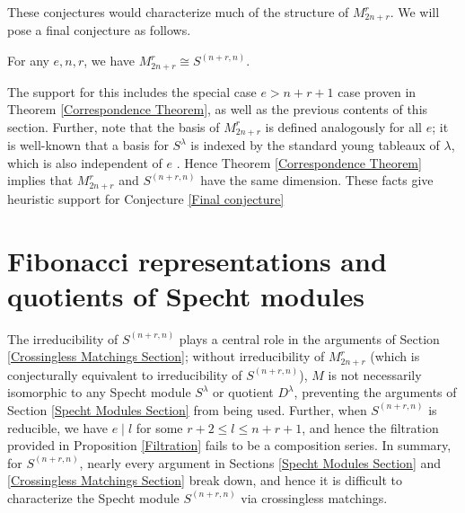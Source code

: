 \documentclass{amsart}
\begin{document}
 These conjectures would characterize much of the structure of $M_{2n + r}^r$.
 We will pose a final conjecture as follows.
 \begin{conjecture}\label{Final conjecture}
 	For any $e,n,r$, we have $M_{2n + r}^r \cong S^{(n+r,n)}$.
 \end{conjecture}
 The support for this includes the special case $e > n+r+1$ case proven in Theorem \ref{Correspondence Theorem}, as well as the previous contents of this section.
 Further, note that the basis of $M_{2n + r}^r$ is defined analogously for all $e$;
 it is well-known that a basis for $S^\lambda$ is indexed by the standard young tableaux of $\lambda$, which is also independent of $e$ \cite[Prop.~3.22]{Mathas-book}.
 Hence Theorem \ref{Correspondence Theorem} implies that $M_{2n + r}^r$ and $S^{(n+r,n)}$ have the same dimension. 
  These facts give heuristic support for Conjecture \ref{Final conjecture}
 
\section{Fibonacci representations and quotients of Specht modules}\label{Fibonacci Section}
The irreducibility of $S^{(n+r,n)}$ plays a central role in the arguments of Section \ref{Crossingless Matchings Section};
without irreducibility of $M_{2n + r}^r$ (which is conjecturally equivalent to irreducibility of $S^{(n+r,n)}$), $M$ is not necessarily isomorphic to any Specht module $S^\lambda$ or quotient $D^\lambda$, preventing the arguments of Section \ref{Specht Modules Section} from being used.
Further, when $S^{(n+r,n)}$ is reducible, we have $e \mid l$ for some $r+2 \leq l \leq n+r+1$, and hence the filtration provided in Proposition \ref{Filtration} fails to be a composition series.
In summary, for $S^{(n+r,n)}$, nearly every argument in Sections \ref{Specht Modules Section} and \ref{Crossingless Matchings Section} break down, and hence it is difficult to characterize the Specht module $S^{(n+r,n)}$ via crossingless matchings.
\end{document}
